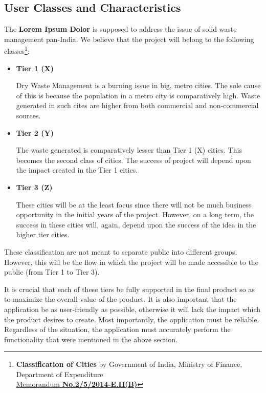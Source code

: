 \documentclass{article}
\begin{document}
\subsection{User Classes and Characteristics}
\par The \textbf{Lorem Ipsum Dolor} is supposed to address the issue of solid waste management pan-India. We believe that the project will belong to the following classes\footnote{\textbf{Classification of Cities} by Government of India, Ministry of Finance, Department of Expenditure\\\href{http://www.finmin.nic.in/sites/default/files/21-07-2015_0.pdf}{Memorandum \textbf{No.2/5/2014-E.II(B)}}}:

\begin{itemize}
    \item \textbf{Tier 1 (X)}
    \par Dry Waste Management is a burning issue in big, metro cities. The sole cause of this is because the population in a metro city is comparatively high. Waste generated in such cites are higher from both commercial and non-commercial sources.
    
    \item \textbf{Tier 2 (Y)}
    \par The waste generated is comparatively lesser than Tier 1 (X) cities. This becomes the second class of cities. The success of project will depend upon the impact created in the Tier 1 cities.
    
    \item \textbf{Tier 3 (Z)}
    \par These cities will be at the least focus since there will not be much business opportunity in the initial years of the project. However, on a long term, the success in these cities will, again, depend upon the success of the idea in the higher tier cities.
\end{itemize}
\par These classification are not meant to separate public into different groups. However, this will be the flow in which the project will be made accessible to the public (from Tier 1 to Tier 3). 
\par It  is  crucial  that  each  of  these  tiers  be  fully  supported  in  the  final  product  so  as  to maximize the overall value of the product. It is also important that the application be as user-friendly as possible, otherwise it will lack the impact which the product desires to create. Most importantly, the application must be reliable. Regardless of the situation, the application must accurately perform the functionality that were mentioned in the above section.  
\end{document}
